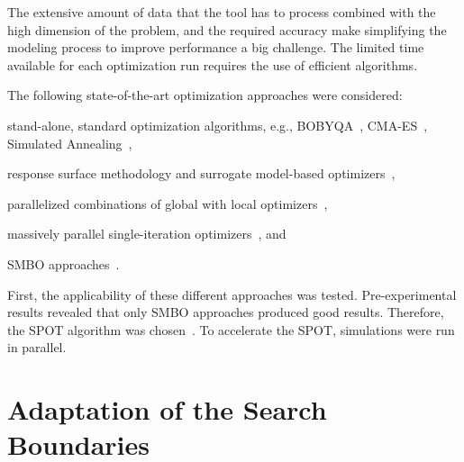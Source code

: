 \documentclass[conference]{IEEEtran}
\begin{document}
The extensive amount of data that the tool has to process combined with the high dimension of the problem, and the required accuracy make simplifying the modeling process to improve performance a big challenge.
The limited time available for each optimization run requires the use of efficient algorithms.

The following state-of-the-art optimization approaches were considered: 
\begin{compactitem}
\item stand-alone, standard optimization algorithms, e.g., BOBYQA~\cite{Powe09a}, CMA-ES~\cite{Hans06a}, Simulated Annealing~\cite{vanL87a},
\item response surface methodology and surrogate model-based optimizers~\cite{Myers2016}, 
\item parallelized  combinations of global with local optimizers~\cite{Good18b},  
\item massively parallel single-iteration optimizers~\cite{Cauw20a,Rena20a}, and 
\item \gls{SMBO} approaches~\cite{Jin11a}.
\end{compactitem}
First, the applicability of these different approaches  was tested. Pre-experimental results revealed that only \gls{SMBO} approaches produced good results. 
Therefore, the \gls{SPOT} algorithm was chosen~\cite{Bart17parxiv}.
To accelerate the \gls{SPOT}, simulations were run in parallel. 

\section{Adaptation of the Search Boundaries}\label{sec:adaptation}
\end{document}
